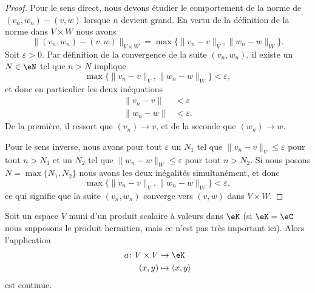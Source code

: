 \begin{proof}
	Pour le sens direct, nous devons étudier le comportement de la norme de \( (v_n,w_n)-(v,w)\) lorsque \( n\) devient grand. En vertu de la définition de la norme dans \( V\times W\) nous avons
	\begin{equation}
		\Big\| (v_n,w_n)-(v,w) \Big\|_{V\times W}=\max\big\{ \| v_n-v \|_V,\| w_n-w \|_W \big\}.
	\end{equation}
	Soit \( \varepsilon>0\). Par définition de la convergence de la suite \( (v_n,w_n)\), il existe un \( N\in\eN\) tel que \( n>N\) implique
	\begin{equation}
		\max\big\{ \| v_n-v \|_V,\| w_n-w \|_W \big\}<\varepsilon,
	\end{equation}
	et donc en particulier les deux inéquations
	\begin{subequations}
		\begin{align}
			\| v_n-v \| & <\varepsilon  \\
			\| w_n-w \| & <\varepsilon.
		\end{align}
	\end{subequations}
	De la première, il ressort que \( (v_n)\to v\), et de la seconde que \( (w_n)\to w\).

	Pour le sens inverse, nous avons pour tout \( \varepsilon\) un \( N_1\) tel que \( \| v_n-v \|_V\leq\varepsilon\) pour tout \( n>N_1\) et un \( N_2\) tel que \( \| w_n-w \|_W\leq\varepsilon\) pour tout \( n>N_2\). Si nous posons \( N=\max\{ N_1,N_2 \}\) nous avons les deux inégalités simultanément, et donc
	\begin{equation}
		\max\big\{ \| v_n-v \|_V,\| w_n-w \|_W \big\}<\varepsilon,
	\end{equation}
	ce qui signifie que la suite \( (v_n,w_n)\) converge vers \( (v,w)\) dans \( V\times W\).
\end{proof}

\begin{proposition}          \label{PROPooKDGOooDjWQct}
	Soit un espace \( V\) muni d'un produit scalaire à valeurs dans \( \eK\) (si \( \eK=\eC\) nous supposons le produit hermitien, mais ce n'est pas très important ici). Alors l'application
	\begin{equation}
		\begin{aligned}
			a\colon V\times V & \to \eK                     \\
			(x,y)             & \mapsto \langle x, y\rangle
		\end{aligned}
	\end{equation}
	est continue.
\end{proposition}

